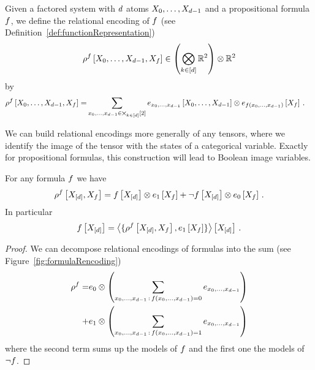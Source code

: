 \begin{definition} %
	Given a factored system with $d$ atoms $X_{0},\ldots,X_{d-1}$ and a propositional formula $f$, we define the relational encoding of $f$ (see Definition~\ref{def:functionRepresentation}) 
		\[ \rho^{f}\left[X_{0},\ldots,X_{d-1},X_{f}\right] \in  \left(\bigotimes_{k\in[d]} \mathbb{R}^2\right) \otimes \mathbb{R}^2 \]
	by 
	\begin{align} 
		\rho^{f}\left[X_{0},\ldots,X_{d-1},X_{f}\right] 
		= & \sum_{{x_{0},\ldots,x_{d-1}}\in\bigtimes_{k\in[d]}[2]}  e_{{x_{0},\ldots,x_{d-1}}}\left[X_{0},\ldots,X_{d-1}\right] \otimes e_{f({x_{0},\ldots,x_{d-1}})}\left[X_{f}\right] \, . 
	\end{align}
\end{definition}

We can build relational encodings more generally of any tensors, where we identify the image of the tensor with the states of a categorical variable.
Exactly for propositional formulas, this construction will lead to Boolean image variables.


\begin{lemma}\label{lem:formulaEncodingDecomposition}
	For any formula $f$ we have
		\[ \rho^{f}\left[X_{[d]},X_{f}\right] 
		= f\left[X_{[d]}\right] \otimes e_{1}\left[X_{f}\right] 
		+ \lnot f\left[X_{[d]}\right] \otimes  e_{0}\left[X_{f}\right] \, . 
		 \]
	In particular
		\[ f\left[X_{[d]}\right] = \left\langle \{
		\rho^{f}\left[X_{[d]},X_{f}\right] , e_{1}\left[X_{f}\right]
		\}\right\rangle \left[ X_{[d]} \right] \, . \]
\end{lemma}
\begin{proof}
	We can decompose relational encodings of formulas into the sum (see Figure~\ref{fig:formulaRencoding}) %
	\begin{align} 
		\rho^{f} = & e_0 \otimes \left( \sum_{{x_{0},\ldots,x_{d-1}}\, : \, f({x_{0},\ldots,x_{d-1}}) = 0}  e_{{x_{0},\ldots,x_{d-1}}} \right) \\
		 + & e_1 \otimes \left( \sum_{{x_{0},\ldots,x_{d-1}}\, : \,  f({x_{0},\ldots,x_{d-1}}) = 1}  e_{{x_{0},\ldots,x_{d-1}}} \right)
	\end{align}
	where the second term sums up the models of $f$ and the first one the models of $\lnot f$.
\end{proof}


